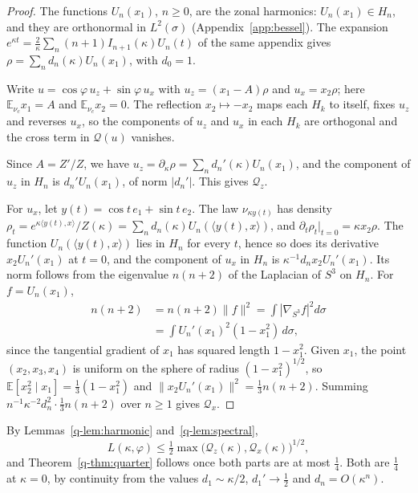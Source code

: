 \documentclass[aps,prd,twocolumn,superscriptaddress,nofootinbib,longbibliography,floatfix,amsmath,amssymb,10pt]{revtex4-2}
\theoremstyle{definition}
\theoremstyle{remark}
\newcommand{\E}{\mathbb{E}}
\newcommand{\ip}[2]{\langle #1,#2\rangle}
\begin{document}
\begin{proof}
The functions $U_n(x_1)$, $n\ge0$, are the zonal harmonics: $U_n(x_1)\in
H_n$, and they are orthonormal in $L^2(\sigma)$ (Appendix~\ref{app:bessel}).
The expansion $e^{\kappa t}=\frac2\kappa\sum_n(n+1)I_{n+1}(\kappa)U_n(t)$ of
the same appendix gives $\rho=\sum_nd_n(\kappa)U_n(x_1)$, with $d_0=1$.

Write $u=\cos\varphi\,u_z+\sin\varphi\,u_x$ with $u_z=(x_1-A)\rho$ and
$u_x=x_2\rho$; here $\E_{\nu_c}x_1=A$ and $\E_{\nu_c}x_2=0$. The reflection
$x_2\mapsto-x_2$ maps each $H_k$ to itself, fixes $u_z$ and reverses $u_x$,
so the components of $u_z$ and $u_x$ in each $H_k$ are orthogonal and the
cross term in $\mathcal Q(u)$ vanishes.

Since $A=Z'/Z$, we have $u_z=\partial_\kappa\rho=\sum_nd_n'(\kappa)U_n(x_1)$,
and the component of $u_z$ in $H_n$ is $d_n'U_n(x_1)$, of norm $|d_n'|$. This
gives $\mathcal Q_z$.

For $u_x$, let $y(t)=\cos t\,e_1+\sin t\,e_2$. The law $\nu_{\kappa y(t)}$ has
density $\rho_t=e^{\kappa\ip{y(t)}x}/Z(\kappa)=\sum_nd_n(\kappa)U_n(\ip{y(t)}x)$,
and $\partial_t\rho_t|_{t=0}=\kappa x_2\rho$. The function
$U_n(\ip{y(t)}x)$ lies in $H_n$ for every $t$, hence so does its derivative
$x_2U_n'(x_1)$ at $t=0$, and the component of $u_x$ in $H_n$ is
$\kappa^{-1}d_nx_2U_n'(x_1)$. Its norm follows from the eigenvalue
$n(n+2)$ of the Laplacian of $S^3$ on $H_n$. For $f=U_n(x_1)$,
\[
\begin{aligned}
n(n+2)&=n(n+2)\|f\|^2=\int|\nabla_{S^3}f|^2d\sigma\\
&=\int U_n'(x_1)^2(1-x_1^2)\,d\sigma ,
\end{aligned}
\]
since the tangential gradient of $x_1$ has squared length $1-x_1^2$. Given
$x_1$, the point $(x_2,x_3,x_4)$ is uniform on the sphere of radius
$(1-x_1^2)^{1/2}$, so $\E[x_2^2\mid x_1]=\frac13(1-x_1^2)$ and
$\|x_2U_n'(x_1)\|^2=\frac13n(n+2)$. Summing $n^{-1}\kappa^{-2}d_n^2\cdot\frac13
n(n+2)$ over $n\ge1$ gives $\mathcal Q_x$.
\end{proof}

By Lemmas~\ref{q-lem:harmonic} and~\ref{q-lem:spectral},
\begin{equation}\label{q-eq:Lbyq}
L(\kappa,\varphi)\le\tfrac12\max\bigl(\mathcal Q_z(\kappa),\mathcal Q_x(
\kappa)\bigr)^{1/2},
\end{equation}
and Theorem~\ref{q-thm:quarter} follows once both parts are at most
$\frac14$. Both are $\frac14$ at $\kappa=0$, by continuity from the values
$d_1\sim\kappa/2$, $d_1'\to\frac12$ and $d_n=O(\kappa^n)$.
\end{document}
